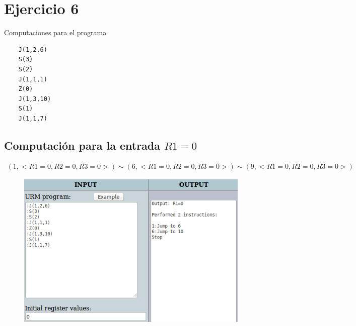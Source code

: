 \section{Ejercicio 6}
	Computaciones para el programa
	\begin{verbatim}
	J(1,2,6)
	S(3)
	S(2)
	J(1,1,1)
	Z(0)
	J(1,3,10)
	S(1)
	J(1,1,7)
	\end{verbatim}
	\subsection{Computación para la entrada $R1=0$}
	\begin{equation*}\begin{gathered}
	(1, <R1=0, R2=0, R3=0>) \sim (6, <R1=0, R2=0, R3=0>) \sim (9, <R1=0, R2=0, R3=0>)
	\end{gathered}\end{equation*}
	\begin{figure}[H]
  		\centering
  		\includegraphics[scale=0.5]{images/60.png}
  	\end{figure}
